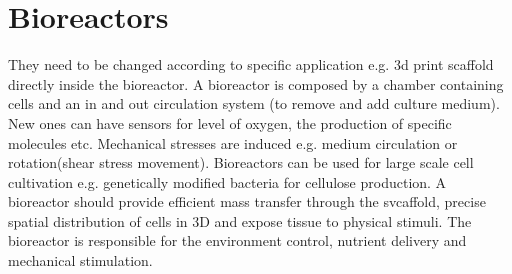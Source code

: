 \section{Bioreactors}
They need to be changed according to specific application e.g. 3d print scaffold directly inside the bioreactor. 
A bioreactor is composed by a chamber containing cells and an in and out circulation system (to remove and add culture medium).
New ones can have sensors for level of oxygen, the production of specific molecules etc.
Mechanical stresses are induced e.g. medium circulation or rotation(shear stress movement).
Bioreactors can be used for large scale cell cultivation e.g. genetically modified bacteria for cellulose production.  A bioreactor should provide efficient mass transfer through the svcaffold, precise spatial distribution of cells in 3D and expose tissue to physical stimuli. 
The bioreactor is responsible for the environment control, nutrient delivery and mechanical stimulation.





